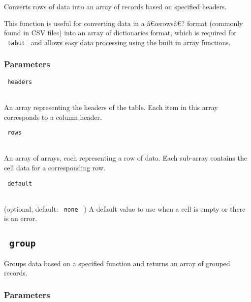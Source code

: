 Converts rows of data into an array of records based on specified
headers.

This function is useful for converting data in a â€œrowsâ€? format
(commonly found in CSV files) into an array of dictionaries format,
which is required for \texttt{\ tabut\ } and allows easy data processing
using the built in array functions.

\begin{Shaded}
\begin{Highlighting}[]
\end{Highlighting}
\end{Shaded}

\subsubsection{Parameters}\label{parameters-3}

\texttt{\ headers\ }\strut \\
An array representing the headers of the table. Each item in this array
corresponds to a column header.

\texttt{\ rows\ }\strut \\
An array of arrays, each representing a row of data. Each sub-array
contains the cell data for a corresponding row.

\texttt{\ default\ }\strut \\
(optional, default: \texttt{\ none\ } ) A default value to use when a
cell is empty or there is an error.

\subsection[\texttt{\ group\ } ]{\texorpdfstring{\texttt{\ group\ }
\protect\hypertarget{group}{}{ }}{ group   }}\label{group}

Groups data based on a specified function and returns an array of
grouped records.

\begin{Shaded}
\begin{Highlighting}[]
\end{Highlighting}
\end{Shaded}

\subsubsection{Parameters}\label{parameters-4}

